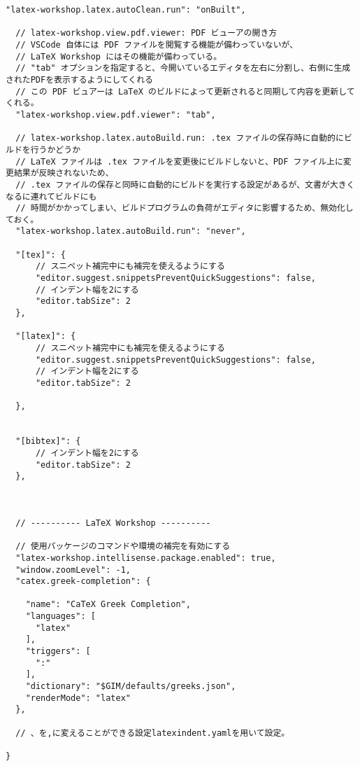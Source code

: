 \documentclass[titlepage]{ltjsarticle}
\begin{document}
\begin{lstlisting}[caption={LaTeX workshopの設定},label=code:latexworkshop]
  "latex-workshop.latex.autoClean.run": "onBuilt",

  // latex-workshop.view.pdf.viewer: PDF ビューアの開き方
  // VSCode 自体には PDF ファイルを閲覧する機能が備わっていないが、
  // LaTeX Workshop にはその機能が備わっている。
  // "tab" オプションを指定すると、今開いているエディタを左右に分割し、右側に生成されたPDFを表示するようにしてくれる
  // この PDF ビュアーは LaTeX のビルドによって更新されると同期して内容を更新してくれる。
  "latex-workshop.view.pdf.viewer": "tab",

  // latex-workshop.latex.autoBuild.run: .tex ファイルの保存時に自動的にビルドを行うかどうか
  // LaTeX ファイルは .tex ファイルを変更後にビルドしないと、PDF ファイル上に変更結果が反映されないため、
  // .tex ファイルの保存と同時に自動的にビルドを実行する設定があるが、文書が大きくなるに連れてビルドにも
  // 時間がかかってしまい、ビルドプログラムの負荷がエディタに影響するため、無効化しておく。
  "latex-workshop.latex.autoBuild.run": "never",

  "[tex]": {
      // スニペット補完中にも補完を使えるようにする
      "editor.suggest.snippetsPreventQuickSuggestions": false,
      // インデント幅を2にする
      "editor.tabSize": 2
  },

  "[latex]": {
      // スニペット補完中にも補完を使えるようにする
      "editor.suggest.snippetsPreventQuickSuggestions": false,
      // インデント幅を2にする
      "editor.tabSize": 2
      
  }, 


  "[bibtex]": {
      // インデント幅を2にする
      "editor.tabSize": 2
  },
  


  // ---------- LaTeX Workshop ----------

  // 使用パッケージのコマンドや環境の補完を有効にする
  "latex-workshop.intellisense.package.enabled": true,
  "window.zoomLevel": -1,
  "catex.greek-completion": {
  
    "name": "CaTeX Greek Completion",
    "languages": [
      "latex"
    ],
    "triggers": [
      ":"
    ],
    "dictionary": "$GIM/defaults/greeks.json",
    "renderMode": "latex"
  },

  // 、を,に変えることができる設定latexindent.yamlを用いて設定。

}  
\end{lstlisting}
\end{document}
